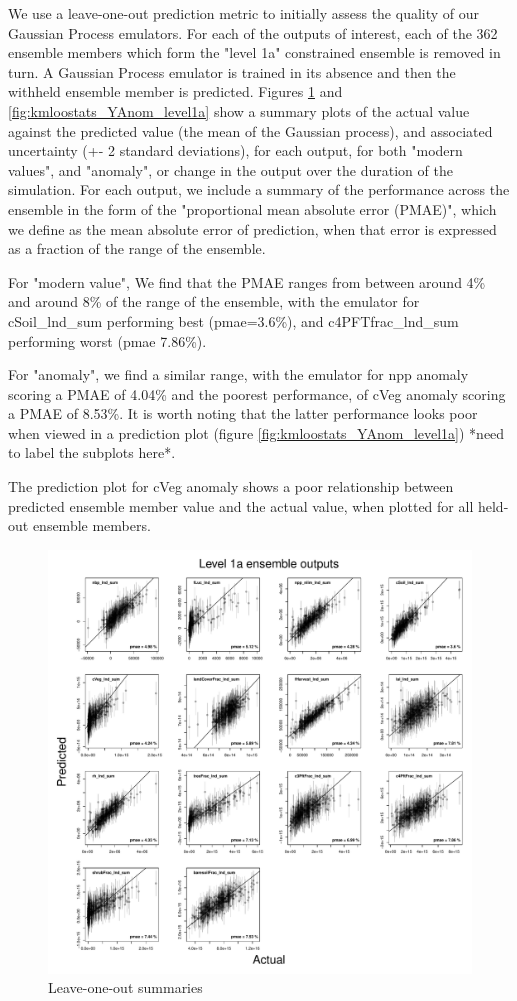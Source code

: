 \documentclass[gmd, manuscript]{copernicus}
\begin{document}
We use a leave-one-out prediction metric to initially assess the quality of our Gaussian Process emulators. For each of the outputs of interest, each of the 362 ensemble members which form the "level 1a" constrained ensemble is removed in turn. A Gaussian Process emulator is trained in its absence and then the withheld ensemble member is predicted. Figures \ref{fig:kmloostats_Y_level1a} and \ref{fig:kmloostats_YAnom_level1a}  show a summary plots of the actual value against the predicted value (the mean of the Gaussian process), and associated uncertainty (+- 2 standard deviations), for each output, for both "modern values", and "anomaly", or change in the output over the duration of the simulation. For each output, we include a summary of the performance across the ensemble in the form of the "proportional mean absolute error (PMAE)", which we define as the mean absolute error of prediction, when that error is expressed as a fraction of the range of the ensemble.

For "modern value", We find that the PMAE ranges from between around 4\% and around 8\% of the range of the ensemble, with the emulator for cSoil\_lnd\_sum performing best (pmae=3.6\%), and c4PFTfrac\_lnd\_sum performing worst (pmae  7.86\%).

For "anomaly", we find a similar range, with the emulator for npp anomaly scoring a PMAE of 4.04\% and the poorest performance, of cVeg anomaly scoring a PMAE of 8.53\%. It is worth noting that the latter performance looks poor when viewed in a prediction plot (figure \ref{fig:kmloostats_YAnom_level1a}) *need to label the subplots here*.

The prediction plot for cVeg anomaly shows a poor relationship between predicted ensemble member value and the actual value, when plotted for all held-out ensemble members.

%
\begin{figure}[t]
\includegraphics[width=12cm]{./graphics/kmloostats_Y_level1a.pdf}
\caption{Leave-one-out summaries }
\label{fig:kmloostats_Y_level1a}
\end{figure}
\end{document}
